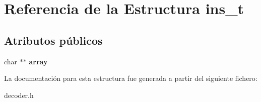 \hypertarget{structins__t}{}\section{Referencia de la Estructura ins\+\_\+t}
\label{structins__t}
\subsection*{Atributos públicos}
\begin{DoxyCompactItemize}
\item 
\hypertarget{structins__t_a6dd6976864faa9c8d34ef5e3f1b4eb89}{}char $\ast$$\ast$ {\bfseries array}\label{structins__t_a6dd6976864faa9c8d34ef5e3f1b4eb89}

\end{DoxyCompactItemize}


La documentación para esta estructura fue generada a partir del siguiente fichero\+:\begin{DoxyCompactItemize}
\item 
decoder.\+h\end{DoxyCompactItemize}
